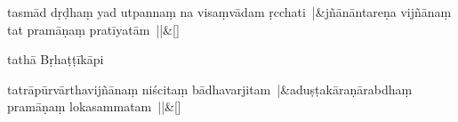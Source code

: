 \documentclass[article,12pt,a4paper]{memoir}%
\newcounter{parCount}
\begin{document}
	    
	    \stanza[\smallbreak]
	  tasmād dṛḍhaṃ yad utpannaṃ na visaṃvādam ṛcchati |&jñānāntareṇa vijñānaṃ tat pramāṇaṃ pratīyatām ||\&[\smallbreak]
	  
	  
	  

	  \pstart \leavevmode%
	tathā Bṛhaṭṭīkāpi
	{}
	\pend%
      
	    
	    \stanza[\smallbreak]
	  \label{ratnakīrtinibandhāvali__36r1PD1OQIW6MGHHK6UP56XMABT}tatrāpūrvārthavijñānaṃ niścitaṃ bādhavarjitam |&aduṣṭakāraṇārabdhaṃ pramāṇaṃ lokasammatam ||\&[\smallbreak]
	  
	  
	  
\end{document}
